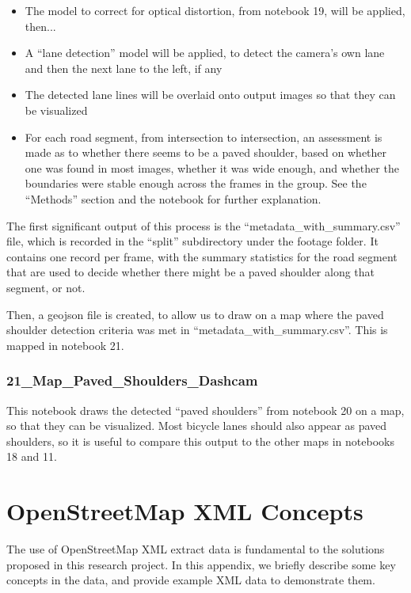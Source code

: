 \documentclass[11pt,twoside]{report}
\begin{document}
\begin{itemize}
\item{The model to correct for optical distortion, from notebook 19, will be applied, then...}
\item{A ``lane detection'' model will be applied, to detect the camera's own lane and then the next lane to the left, if any}
\item{The detected lane lines will be overlaid onto output images so that they can be visualized}
\item{For each road segment, from intersection to intersection, an assessment is made as to whether there seems to be a paved shoulder, based on whether one was found in most images, whether it was wide enough, and whether the boundaries were stable enough across the frames in the group.  See the ``Methods'' section and the notebook for further explanation.}	
\end{itemize}

The first significant output of this process is the ``metadata\_with\_summary.csv'' file, which is recorded in the ``split'' subdirectory under the footage folder.  It contains one record per frame, with the summary statistics for the road segment that are used to decide whether there might be a paved shoulder along that segment, or not.

Then, a geojson file is created, to allow us to draw on a map where the paved shoulder detection criteria was met in ``metadata\_with\_summary.csv''.  This is mapped in notebook 21.


\subsection{21\_Map\_Paved\_Shoulders\_Dashcam}
\label{a21}

This notebook draws the detected ``paved shoulders'' from notebook 20 on a map, so that they can be visualized.  Most bicycle lanes should also appear as paved shoulders, so it is useful to compare this output to the other maps in notebooks 18 and 11.



\chapter{OpenStreetMap XML Concepts}
\label{a:osm_concepts}

The use of OpenStreetMap XML extract data is fundamental to the solutions proposed in this research project.  In this appendix, we briefly describe some key concepts in the data, and provide example XML data to demonstrate them.
\end{document}
